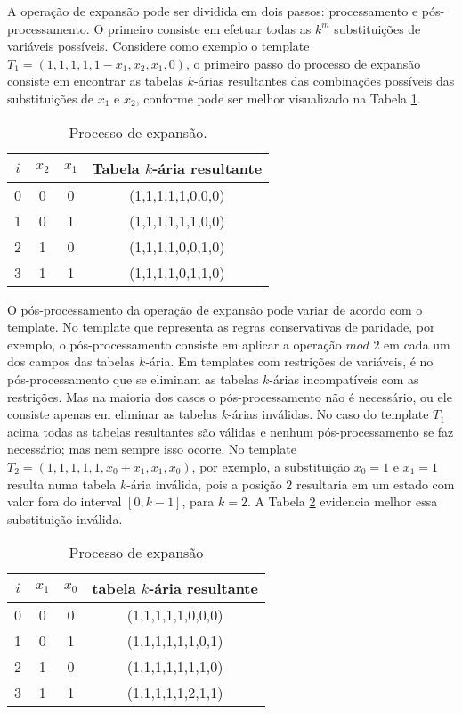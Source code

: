 A operação de expansão pode ser dividida em dois passos: processamento e pós-processamento. O primeiro consiste em efetuar todas as $k^m$ substituições de variáveis possíveis. Considere como exemplo o template $T_1 = (1,1,1,1,1-x_1,x_2,x_1,0)$, o primeiro passo do processo de expansão consiste em encontrar as tabelas $k$-árias resultantes das combinações possíveis das substituições de $x_1$ e $x_2$, conforme pode ser melhor visualizado na Tabela \ref{tab:expansionProcess}.
\begin{table}[h!]
\centering
\caption{Processo de expansão.}
	\begin{tabular}{cccc}
    \toprule
	$i$ & $x_2$ & $x_1$ & Tabela $k$-ária resultante \\
    \midrule
	0	&	0	&	0	&	(1,1,1,1,1,0,0,0)	\\
	1	&	0	&	1	&	(1,1,1,1,1,1,0,0)	\\
	2	&	1	&	0	&	(1,1,1,1,0,0,1,0)	\\
	3	&	1	&	1	&	(1,1,1,1,0,1,1,0)	\\
    \bottomrule
	\end{tabular}
\label{tab:expansionProcess}
\end{table}

O pós-processamento da operação de expansão pode variar de acordo com o template. No template que representa as regras conservativas de paridade, por exemplo, o pós-processamento consiste em aplicar a operação $mod$ $2$ em cada um dos campos das tabelas $k$-ária. Em templates com restrições de variáveis, é no pós-processamento que se eliminam as tabelas $k$-árias incompatíveis com as restrições. Mas na maioria dos casos o pós-processamento não é necessário, ou ele consiste apenas em eliminar as tabelas $k$-árias inválidas. No caso do template $T_1$ acima todas as tabelas resultantes são válidas e nenhum pós-processamento se faz necessário; mas nem sempre isso ocorre. No template $T_2 = (1,1,1,1,1,x_0+x_1,x_1,x_0)$, por exemplo, a substituição $x_0 = 1$ e $x_1 = 1$ resulta numa tabela $k$-ária inválida, pois a posição $2$ resultaria em um estado com valor fora do interval $[0,k-1]$, para $k=2$. A Tabela \ref{tab:invalideExpansion} evidencia melhor essa substituição inválida.
\begin{table}[h!]
\centering
\caption{Processo de expansão}
	\begin{tabular}{cccc}
    \toprule
	$i$ & $x_1$ & $x_0$ & tabela $k$-ária resultante \\
    \midrule
	0	&	0	&	0	&	(1,1,1,1,1,0,0,0)	\\
	1	&	0	&	1	&	(1,1,1,1,1,1,0,1)	\\
	2	&	1	&	0	&	(1,1,1,1,1,1,1,0)	\\
	3	&	1	&	1	&	(1,1,1,1,1,2,1,1)	\\
    \bottomrule
   	\end{tabular}
\label{tab:invalideExpansion}
\end{table}

